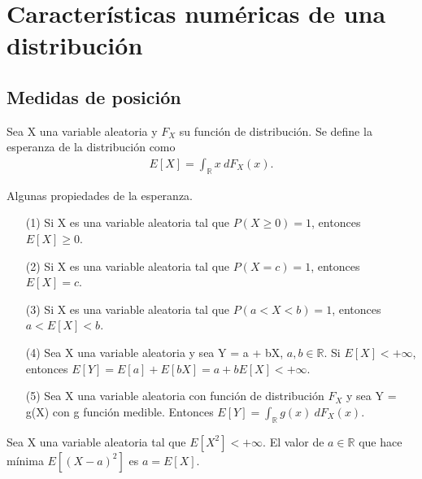 \chapter{Características numéricas de una distribución}

\section{Medidas de posición}

\begin{defi}[Esperanza]
Sea X una variable aleatoria y $F_X$ su función de distribución. Se define la esperanza de la distribución como
\begin{align*}
    E[X] = \int_{\mathbb{R}}{x \ dF_X(x)}.
\end{align*}
\end{defi}

\begin{prop}
Algunas propiedades de la esperanza.
\begin{enumerate}
    \item[(1)] Si X es una variable aleatoria tal que $P(X \ge 0) = 1$, entonces $E[X] \ge 0$.
    \item[(2)] Si X es una variable aleatoria tal que $P(X = c) = 1$, entonces $E[X] = c$.
    \item[(3)] Si X es una variable aleatoria tal que $P(a < X < b) = 1$, entonces $a < E[X] < b$.
    \item[(4)] Sea X una variable aleatoria y sea Y = a + bX, $a, b \in \mathbb{R}$. Si $E[X] < +\infty$, entonces $E[Y] = E[a] + E[bX] = a + bE[X] < +\infty$.
    \item[(5)] Sea X una variable aleatoria con función de distribución $F_X$ y sea Y = g(X) con g función medible. Entonces $E[Y] = \int_{\mathbb{R}}{g(x) \ dF_X(x)}$.
\end{enumerate}
\end{prop}

\begin{teo}
Sea X una variable aleatoria tal que $E[X^2] < +\infty$. El valor de $a \in \mathbb{R}$ que hace mínima $E[(X - a)^2]$ es $a = E[X]$.
\end{teo}

